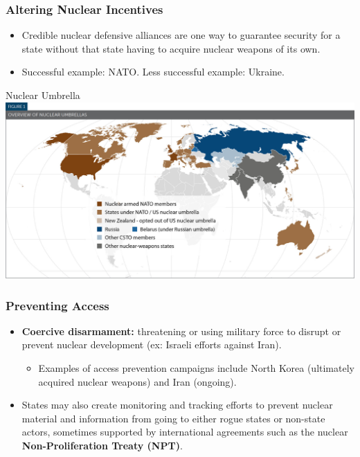 \documentclass{beamer}
\begin{document}
\begin{frame} 
\frametitle{\LARGE{Altering Nuclear Incentives}}
\begin{itemize}
		\item Credible nuclear defensive alliances are one way to guarantee security for a state without that state having to acquire nuclear weapons of its own. \pause
		\item Successful example: NATO. Less successful example: Ukraine.
\end{itemize}
\end{frame}

\begin{frame}{\LARGE Nuclear Umbrella}
    \centering
\includegraphics[width=\textwidth,height=0.8\textheight,keepaspectratio]{nuclear umbrella.png}
\end{frame}

\begin{frame} 
	\frametitle{\LARGE{Preventing Access}}
	\begin{itemize}
		\item \textbf{Coercive disarmament:} threatening or using military force to disrupt or prevent nuclear development (ex: Israeli efforts against Iran). 
		\begin{itemize}
			\item Examples of access prevention campaigns include North Korea (ultimately acquired nuclear weapons) and Iran (ongoing). \pause
		\end{itemize}
		\item States may also create monitoring and tracking efforts to prevent nuclear material and information from going to either rogue states or non-state actors, sometimes supported by international agreements such as the nuclear \textbf{Non-Proliferation Treaty (NPT)}.
	\end{itemize}
\end{frame}
\end{document}
